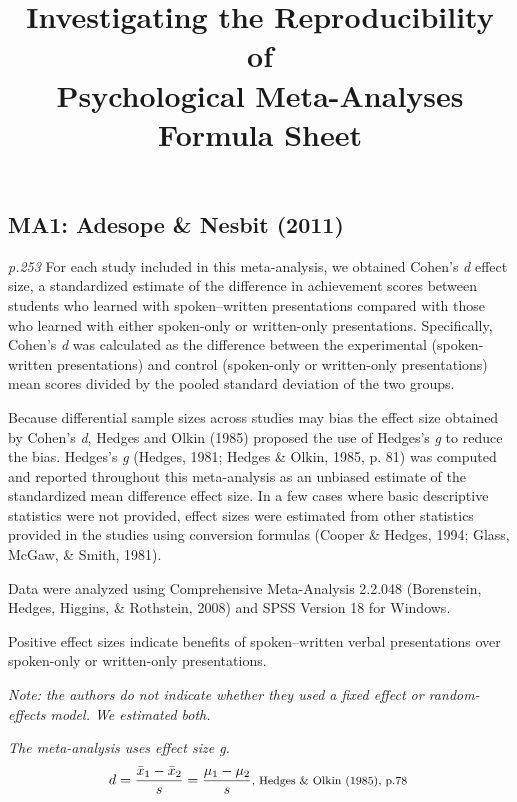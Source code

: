 \documentclass{article}
\date{\vspace{-5ex}}
\begin{document}
\title{Investigating the Reproducibility of \\
Psychological Meta-Analyses \\
Formula Sheet}
\author{}
\maketitle

\subsection*{MA1: Adesope \& Nesbit (2011)}
\textit{p.253} For each study included in this meta-analysis, we obtained Cohen’s \textit{d} effect size, a standardized estimate of the difference in achievement scores between students who learned with spoken–written presentations compared with those who learned with either spoken-only or written-only presentations. Specifically, Cohen’s \textit{d} was calculated as the difference between the experimental (spoken-written presentations) and control (spoken-only or written-only presentations) mean scores divided by the pooled standard deviation of the two groups. 

Because differential sample sizes across studies may bias the effect size obtained by Cohen’s \textit{d}, Hedges and Olkin (1985) proposed the use of Hedges’s \textit{g} to reduce the bias. Hedges’s \textit{g} (Hedges, 1981; Hedges \& Olkin, 1985, p. 81) was computed and reported throughout this meta-analysis as an unbiased estimate of the standardized mean difference effect size. In a few cases where basic descriptive statistics were not provided, effect sizes were estimated from other statistics provided in the studies using conversion formulas (Cooper \& Hedges, 1994; Glass, McGaw, \& Smith, 1981).

Data were analyzed using Comprehensive Meta-Analysis 2.2.048 (Borenstein, Hedges, Higgins, \& Rothstein, 2008) and SPSS Version 18 for Windows.

Positive effect sizes indicate benefits of spoken–written verbal presentations over spoken-only or written-only presentations.

\vspace{3mm}
\textit{Note: the authors do not indicate whether they used a fixed effect or random-effects model. We estimated both.}

\vspace{3mm}
\textit{The meta-analysis uses effect size g.}
\begin{equation*}
d={\frac {{\bar {x}}_{1}-{\bar {x}}_{2}}{s}}={\frac {\mu_{1}-\mu_{2}}{s}}  \mbox {\footnotesize, Hedges \& Olkin (1985), p.78 } 
\end{equation*}
\end{document}

